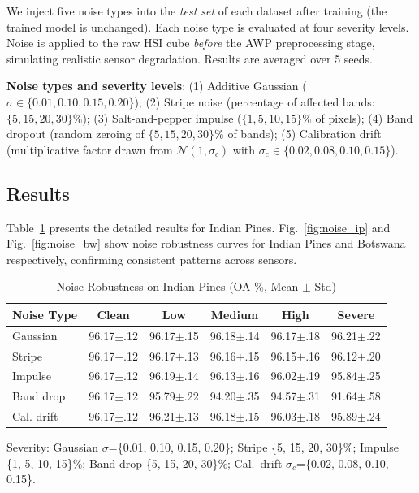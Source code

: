 \documentclass[pdflatex,sn-mathphys-num]{sn-jnl}
\theoremstyle{thmstyleone}
\theoremstyle{thmstyletwo}
\theoremstyle{thmstylethree}
\begin{document}
We inject five noise types into the \textit{test set} of each dataset after training (the trained model is unchanged). Each noise type is evaluated at four severity levels. Noise is applied to the raw HSI cube \textit{before} the AWP preprocessing stage, simulating realistic sensor degradation. Results are averaged over 5 seeds.

\textbf{Noise types and severity levels}: (1) Additive Gaussian ($\sigma \in \{0.01, 0.10, 0.15, 0.20\}$); (2) Stripe noise (percentage of affected bands: $\{5, 15, 20, 30\}\%$); (3) Salt-and-pepper impulse ($\{1, 5, 10, 15\}\%$ of pixels); (4) Band dropout (random zeroing of $\{5, 15, 20, 30\}\%$ of bands); (5) Calibration drift (multiplicative factor drawn from $\mathcal{N}(1, \sigma_c)$ with $\sigma_c \in \{0.02, 0.08, 0.10, 0.15\}$).

\subsection{Results}

Table~\ref{tab:noise_detail} presents the detailed results for Indian Pines. Fig.~\ref{fig:noise_ip} and Fig.~\ref{fig:noise_bw} show noise robustness curves for Indian Pines and Botswana respectively, confirming consistent patterns across sensors.

\begin{table}[!t]
\caption{Noise Robustness on Indian Pines (OA \%, Mean $\pm$ Std)}
\label{tab:noise_detail}
\centering

\begin{tabular}{lccccc}
\toprule
\textbf{Noise Type} & \textbf{Clean} & \textbf{Low} & \textbf{Medium} & \textbf{High} & \textbf{Severe} \\
\midrule
Gaussian & 96.17$\pm$.12 & 96.17$\pm$.15 & 96.18$\pm$.14 & 96.17$\pm$.18 & 96.21$\pm$.22 \\
Stripe & 96.17$\pm$.12 & 96.17$\pm$.13 & 96.16$\pm$.15 & 96.15$\pm$.16 & 96.12$\pm$.20 \\
Impulse & 96.17$\pm$.12 & 96.19$\pm$.14 & 96.13$\pm$.16 & 96.02$\pm$.19 & 95.84$\pm$.25 \\
Band drop & 96.17$\pm$.12 & 95.79$\pm$.22 & 94.20$\pm$.35 & 94.57$\pm$.31 & 91.64$\pm$.58 \\
Cal. drift & 96.17$\pm$.12 & 96.21$\pm$.13 & 96.18$\pm$.15 & 96.03$\pm$.18 & 95.89$\pm$.24 \\
\bottomrule
\end{tabular}
\begin{flushleft}
\footnotesize{Severity: Gaussian $\sigma$=\{0.01, 0.10, 0.15, 0.20\}; Stripe \{5, 15, 20, 30\}\%; Impulse \{1, 5, 10, 15\}\%; Band drop \{5, 15, 20, 30\}\%; Cal.\ drift $\sigma_c$=\{0.02, 0.08, 0.10, 0.15\}.}
\end{flushleft}
\end{table}
\end{document}
